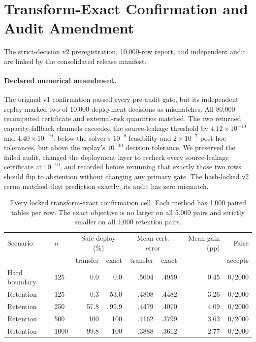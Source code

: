 \section{Transform-Exact Confirmation and Audit Amendment}

The strict-decision v2 preregistration, 10,000-row report, and independent
audit are linked by the consolidated release manifest.

\paragraph{Declared numerical amendment.}
The original v1 confirmation passed every pre-audit gate, but its independent
replay marked two of 10,000 deployment decisions as mismatches. All 80,000
recomputed certificate and external-risk quantities matched. The two returned
capacity-fallback channels exceeded the source-leakage threshold by
$4.12\times10^{-10}$ and $4.40\times10^{-10}$: below the solver's $10^{-9}$
feasibility and $2\times10^{-7}$ post-hoc tolerances, but above the replay's
$10^{-10}$ decision tolerance. We preserved the failed audit, changed the
deployment layer to recheck every source-leakage certificate at $10^{-10}$, and
recorded before rerunning that exactly those two rows should flip to abstention
without changing any primary gate. The hash-locked v2 rerun matched that
prediction exactly; its audit has zero mismatch.

\begin{table}[t]
\centering
\small
\setlength{\tabcolsep}{4.2pt}
\begin{tabular}{llrrrrrr}
\hline
Scenario & $n$ & \multicolumn{2}{c}{Safe deploy (\%)} &
\multicolumn{2}{c}{Mean cert. error} & Mean gain (pp) & False \\
&& transfer & exact & transfer & exact && accepts \\
\hline
Hard boundary & 125 & 0.0 & 0.0 & .5004 & .4959 & 0.45 & 0/2000 \\
Retention & 125 & 0.3 & 53.0 & .4808 & .4482 & 3.26 & 0/2000 \\
Retention & 250 & 57.8 & 99.9 & .4479 & .4070 & 4.09 & 0/2000 \\
Retention & 500 & 100 & 100 & .4162 & .3799 & 3.63 & 0/2000 \\
Retention & 1000 & 99.8 & 100 & .3888 & .3612 & 2.77 & 0/2000 \\
\hline
\end{tabular}
\caption{Every locked transform-exact confirmation cell. Each method has 1,000
paired tables per row. The exact objective is no larger on all 5,000 pairs and
strictly smaller on all 4,000 retention pairs.}
\label{supp:tab:exactcells}
\end{table}

